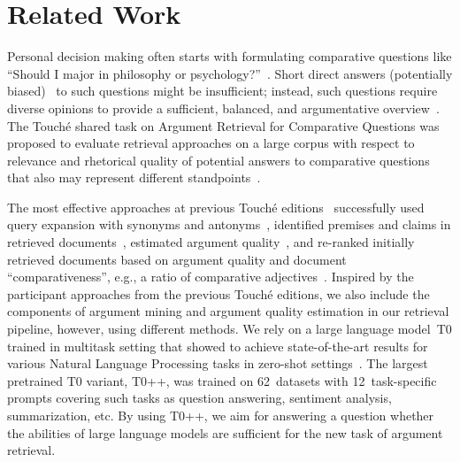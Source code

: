 \section{Related Work}

Personal decision making often starts with formulating comparative questions like ``Should I major in philosophy or psychology?''~\cite{BondarenkoFBGAPBSWPH2020,BondarenkoGFBAPBSWPH2021,BondarenkoFKSGBPBSWPH2022}. Short direct answers (potentially biased)~\cite{PotthastHS2020} to such questions might be insufficient; instead, such questions require diverse opinions to provide a sufficient, balanced, and argumentative overview~\cite{BondarenkoFBGAPBSWPH2020}.
The Touch{\'e} shared task on Argument Retrieval for Comparative Questions was proposed to evaluate retrieval approaches on a large corpus with respect to relevance and rhetorical quality of potential answers to comparative questions that also may represent different standpoints~\cite{BondarenkoADHBH22}.

The most effective approaches at previous Touch{\'e} editions~\cite{BondarenkoFBGAPBSWPH2020,BondarenkoGFBAPBSWPH2021} successfully used query expansion with synonyms and antonyms~\cite{AbyeST2020}, identified premises and claims in retrieved documents~\cite{Huck2020, ShirshakovaW2021}, estimated argument quality~\cite{AbyeST2020}, and re-ranked initially retrieved documents based on argument quality and document ``comparativeness'', e.g., a ratio of comparative adjectives~\cite{ChekalinaP2021}. Inspired by the participant approaches from the previous Touch{\'e} editions, we also include the components of argument mining and argument quality estimation in our retrieval pipeline, however, using different methods.
We rely on a large language model~T0 trained in multitask setting that showed to achieve state-of-the-art results for various Natural Language Processing tasks in zero-shot settings~\cite{SanhWRBSACSLRDBXTSSKCNDCJWMSYPBWNRSSFFTBGBWR2021}. The largest pretrained T0 variant, T0++, was trained on 62~datasets with 12~task-specific prompts covering such tasks as question answering, sentiment analysis, summarization, etc. By using T0++, we aim for answering a question whether the abilities of large language models are sufficient for the new task of argument retrieval.

